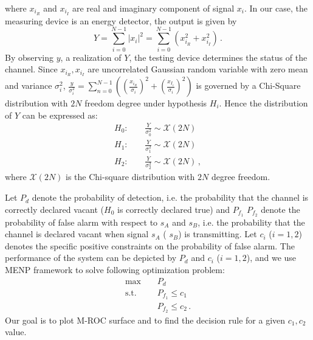 where $x_{i_R}$ and $x_{i_I}$ are real and imaginary component of signal $x_i$.
In our case, the measuring device is an energy detector, the output is given by
\begin{equation} 
  Y = \sum_{i=0}^{N-1}|x_i|^2 = \sum_{i=0}^{N-1}(x_{i_R}^2+x_{i_I}^2)\,.
  \label{equ: testing device}
\end{equation}
By observing $y$, a realization of $Y$, the testing device determines the status of the channel. 
Since $x_{i_R}, x_{i_I}$ are uncorrelated Gaussian random variable with zero mean and variance $\sigma_i^2$, $\frac{y}{\sigma_i^2} = \sum_{n=0}^{N-1}((\frac{x_{i_R}}{\sigma_i})^2 + (\frac{x_{I_i}}{\sigma_i})^2)$ is governed by a Chi-Square distribution with $2N$ freedom degree under hypothesis $H_i$.
Hence the distribution of $Y$ can be expressed as:
\begin{equation} 
  \label{equ: abstract}
  \begin{split}
	H_0:\;\;\;\;&\frac{Y}{\sigma_0^2}\sim \mathcal{X}(2N)\\
	H_1:\;\;\;\;&\frac{Y}{\sigma_1^2}\sim \mathcal{X}(2N)\\
	H_2:\;\;\;\;&\frac{Y}{\sigma_2^2}\sim \mathcal{X}(2N)\,,
  \end{split}
\end{equation}
where $\mathcal{X}(2N)$ is the Chi-square distribution with $2N$ degree freedom. 

Let $P_d$ denote the probability of detection, i.e. the probability that the channel is correctly declared vacant ($H_0$ is correctly declared true) and $P_{f_1}$ $P_{f_2}$ denote the probability of false alarm with respect to $s_A$  and $s_B$, i.e. the probability that the channel is declared vacant when signal $s_A$ ( $s_B$) is transmitting. Let $c_i$ ($i = 1, 2$) denotes the specific positive constraints on the probability of false alarm. The performance of the system can be depicted by $P_d$ and $c_i$ ($i = 1, 2$), and we use MENP framework to solve following optimization problem:
\begin{equation}
  \begin{split}
	\max\;\;\;\;&P_d\\
	\text{s.t.}\;\;\;\;&P_{f_1}\leq c_1\\
	&P_{f_2} \leq c_2\,.
  \end{split}
  \label{1129a3}
\end{equation}
Our goal is to plot M-ROC surface and to find the decision rule for a given $c_1, c_2$ value.

